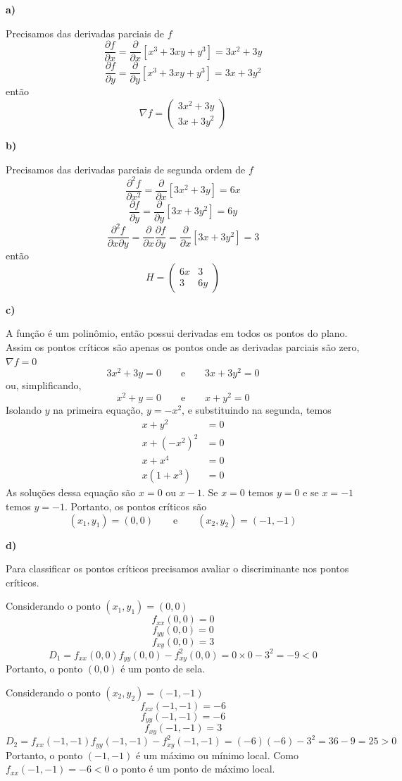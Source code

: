 \documentclass[a4paper,12pt,fleqn]{article}
\newcommand{\D}[2]{\frac{\partial {#1}}{\partial {#2}}}
\newcommand{\DS}[2]{\frac{\partial^2 {#1}}{\partial {#2}^2}}
\newcommand{\DM}[3]{\frac{\partial^2 {#1}}{\partial {#2} \partial {#3}}}
\newcommand{\vetor}[2]{\left(\begin{array}{c} #1 \\ #2 \end{array}\right)}
\begin{document}
\begin{answer}
  \noindent\textbf{a)}

  Precisamos das derivadas parciais de $f$
  \[
    \D{f}{x}
    = \D{}{x}\left[x^3 + 3xy + y^3\right]
    = 3x^2 + 3y
  \]
  \[
    \D{f}{y}
    = \D{}{y}\left[x^3 + 3xy + y^3\right]
    = 3x + 3y^2
  \]
  então
  \[
    \nabla f = \vetor{3x^2 + 3y}{3x + 3y^2}
  \]


  \noindent\textbf{b)}

  Precisamos das derivadas parciais de segunda ordem de $f$
  \[
    \DS{f}{x}
    = \D{}{x}\left[3x^2 + 3y\right]
    = 6x
  \]
  \[
    \D{f}{y}
    = \D{}{y}\left[3x + 3y^2\right]
    = 6y
  \]
  \[
    \DM{f}{x}{y}
    = \D{}{x}\D{f}{y}
    = \D{}{x}\left[3x + 3y^2\right]
    = 3
  \]
  então
  \[
    H = \left(\begin{array}{cc}
          6x & 3 \\
          3 & 6y
        \end{array}\right)
  \]

  \noindent\textbf{c)}

  A função é um polinômio, então possui derivadas em todos os pontos do plano.
  Assim os pontos críticos são apenas os pontos onde as derivadas parciais são zero,
  \(\nabla f = 0\)
  \[
    3x^2 + 3y = 0
    \qquad\text{e}\qquad
    3x + 3y^2 = 0
  \]
  ou, simplificando,
  \[
    x^2 + y = 0
    \qquad\text{e}\qquad
    x + y^2 = 0
  \]
  Isolando $y$ na primeira equação, \(y = -x^2\), e substituindo na segunda, temos
  \begin{align*}
    x + y^2                 & = 0 \\
    x + \left(-x^2\right)^2 & = 0 \\
    x + x^4                 & = 0 \\
    x(1+ x^3)               & = 0
  \end{align*}
  As soluções dessa equação são $x=0$ ou $x-1$.
  Se $x=0$ temos $y=0$ e
  se $x=-1$ temos $y=-1$.
  Portanto, os pontos críticos são
  \[
    (x_1, y_1) = (0, 0)
    \qquad\text{e}\qquad
    (x_2, y_2) = (-1, -1)
  \]

  \noindent\textbf{d)}

  Para classificar os pontos críticos precisamos avaliar o discriminante nos
  pontos críticos.

  Considerando o ponto \((x_1, y_1) = (0, 0)\)
  \[
    f_{xx}(0, 0) = 0
  \]
  \[
    f_{yy}(0, 0) = 0
  \]
  \[
    f_{xy}(0, 0) = 3
  \]
  \[
    D_1
    = f_{xx}(0, 0)f_{yy}(0, 0) - f^2_{xy}(0, 0)
    = 0 \times 0 - 3^2
    = -9 < 0
  \]
  Portanto, o ponto $(0, 0)$ é um ponto de sela.

  Considerando o ponto \((x_2, y_2) = (-1, -1)\)
  \[
    f_{xx}(-1, -1) = -6
  \]
  \[
    f_{yy}(-1, -1) = -6
  \]
  \[
    f_{xy}(-1, -1) = 3
  \]
  \[
    D_2
    = f_{xx}(-1, -1)f_{yy}(-1, -1) - f^2_{xy}(-1, -1)
    = (-6)(-6) - 3^2
    = 36 - 9
    = 25 > 0
  \]
  Portanto, o ponto $(-1, -1)$ é um máximo ou mínimo local.
  Como \(f_{xx}(-1, -1) = -6 < 0\)
  o ponto é um ponto de máximo local.
\end{answer}

\end{document}
